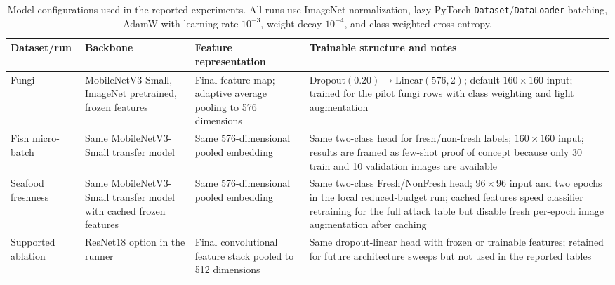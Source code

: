 \documentclass[conference]{IEEEtran}
\begin{document}
\begin{table}[t]
\centering
\caption{Model configurations used in the reported experiments. All runs use ImageNet normalization, lazy PyTorch \texttt{Dataset}/\texttt{DataLoader} batching, AdamW with learning rate \(10^{-3}\), weight decay \(10^{-4}\), and class-weighted cross entropy.}
\label{tab:modelconfigs}
\small
\begin{tabular}{p{}p{}p{}p{}}
\toprule
Dataset/run & Backbone & Feature representation & Trainable structure and notes \\
\midrule
Fungi & MobileNetV3-Small, ImageNet pretrained, frozen features & Final feature map; adaptive average pooling to 576 dimensions & \(\mathrm{Dropout}(0.20)\rightarrow\mathrm{Linear}(576,2)\); default \(160\times160\) input; trained for the pilot fungi rows with class weighting and light augmentation \\
Fish micro-batch & Same MobileNetV3-Small transfer model & Same 576-dimensional pooled embedding & Same two-class head for fresh/non-fresh labels; \(160\times160\) input; results are framed as few-shot proof of concept because only 30 train and 10 validation images are available \\
Seafood freshness & Same MobileNetV3-Small transfer model with cached frozen features & Same 576-dimensional pooled embedding & Same two-class Fresh/NonFresh head; \(96\times96\) input and two epochs in the local reduced-budget run; cached features speed classifier retraining for the full attack table but disable fresh per-epoch image augmentation after caching \\
Supported ablation & ResNet18 option in the runner~\cite{resnet} & Final convolutional feature stack pooled to 512 dimensions & Same dropout-linear head with frozen or trainable features; retained for future architecture sweeps but not used in the reported tables \\
\bottomrule
\end{tabular}
\end{table}
\end{document}

